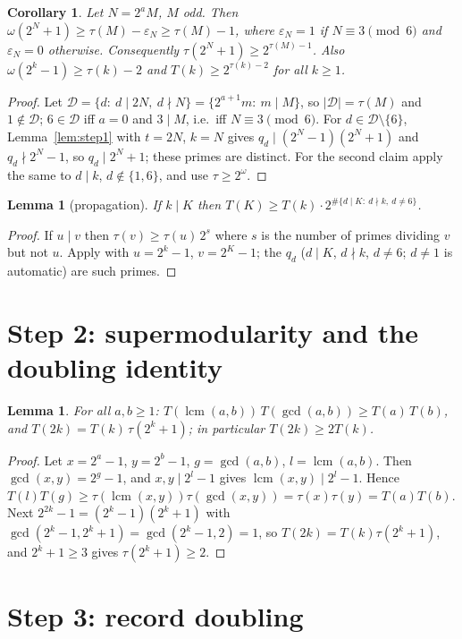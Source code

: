 \documentclass[11pt]{article}
\newtheorem{lemma}[theorem]{Lemma}
\newtheorem{corollary}[theorem]{Corollary}
\theoremstyle{remark}
\newcommand{\lcm}{\operatorname{lcm}}
\begin{document}
\begin{corollary}\label{cor:omega}
Let $N=2^aM$, $M$ odd. Then $\omega(2^N+1)\ge\tau(M)-\varepsilon_N\ge\tau(M)-1$, where
$\varepsilon_N=1$ if $N\equiv3\pmod 6$ and $\varepsilon_N=0$ otherwise. Consequently
$\tau(2^N+1)\ge2^{\tau(M)-1}$. Also $\omega(2^k-1)\ge\tau(k)-2$ and $T(k)\ge2^{\tau(k)-2}$
for all $k\ge1$.
\end{corollary}
\begin{proof}
Let $\mathcal D=\{d:\ d\mid2N,\ d\nmid N\}=\{2^{a+1}m:\ m\mid M\}$, so $|\mathcal D|=\tau(M)$ and
$1\notin\mathcal D$; $6\in\mathcal D$ iff $a=0$ and $3\mid M$, i.e.\ iff $N\equiv3\pmod6$. For
$d\in\mathcal D\setminus\{6\}$, Lemma~\ref{lem:step1} with $t=2N$, $k=N$ gives
$q_d\mid(2^N-1)(2^N+1)$ and $q_d\nmid2^N-1$, so $q_d\mid2^N+1$; these primes are distinct.
For the second claim apply the same to $d\mid k$, $d\notin\{1,6\}$, and use
$\tau\ge2^{\omega}$.
\end{proof}

\begin{lemma}[propagation]\label{lem:prop}
If $k\mid K$ then $T(K)\ge T(k)\cdot2^{\#\{d\mid K:\ d\nmid k,\ d\ne6\}}$.
\end{lemma}
\begin{proof}
If $u\mid v$ then $\tau(v)\ge\tau(u)\,2^{s}$ where $s$ is the number of primes dividing $v$ but
not $u$. Apply with $u=2^k-1$, $v=2^K-1$; the $q_d$ ($d\mid K$, $d\nmid k$, $d\ne6$; $d\ne1$ is
automatic) are such primes.
\end{proof}

\section{Step 2: supermodularity and the doubling identity}

\begin{lemma}\label{lem:super}
For all $a,b\ge1$: $T(\lcm(a,b))\,T(\gcd(a,b))\ge T(a)\,T(b)$, and $T(2k)=T(k)\,\tau(2^k+1)$;
in particular $T(2k)\ge2T(k)$.
\end{lemma}
\begin{proof}
Let $x=2^a-1$, $y=2^b-1$, $g=\gcd(a,b)$, $l=\lcm(a,b)$. Then $\gcd(x,y)=2^g-1$, and
$x,y\mid2^l-1$ gives $\lcm(x,y)\mid2^l-1$. Hence
$T(l)T(g)\ge\tau(\lcm(x,y))\tau(\gcd(x,y))=\tau(x)\tau(y)=T(a)T(b)$.
Next $2^{2k}-1=(2^k-1)(2^k+1)$ with $\gcd(2^k-1,2^k+1)=\gcd(2^k-1,2)=1$, so
$T(2k)=T(k)\tau(2^k+1)$, and $2^k+1\ge3$ gives $\tau(2^k+1)\ge2$.
\end{proof}

\section{Step 3: record doubling}
\end{document}
